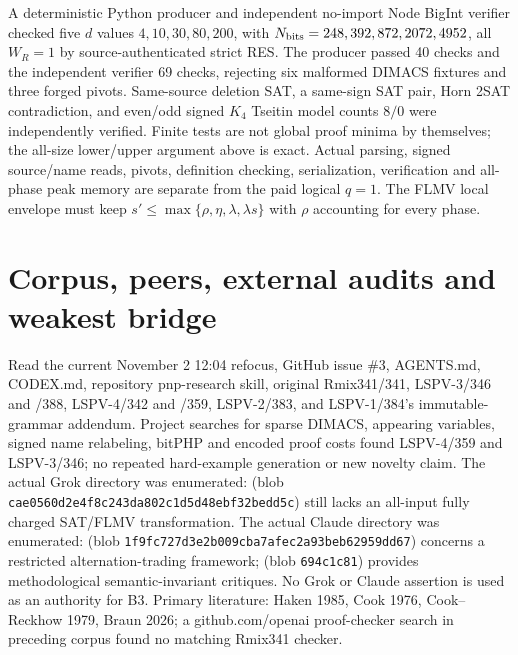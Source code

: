 \documentclass[11pt]{article}
\begin{document}
A deterministic Python producer and independent no-import Node BigInt verifier checked five $d$ values $4,10,30,80,200$, with $N_{\rm bits}=248,392,872,2072,4952$, all $W_R=1$ by source-authenticated strict RES. The producer passed 40 checks and the independent verifier 69 checks, rejecting six malformed DIMACS fixtures and three forged pivots. Same-source deletion SAT, a same-sign SAT pair, Horn 2SAT contradiction, and even/odd signed $K_4$ Tseitin model counts $8/0$ were independently verified. Finite tests are not global proof minima by themselves; the all-size lower/upper argument above is exact. Actual parsing, signed source/name reads, pivots, definition checking, serialization, verification and all-phase peak memory are separate from the paid logical $q=1$. The FLMV local envelope must keep $s'\le\max\{\rho,\eta,\lambda,\lambda s\}$ with $\rho$ accounting for every phase.

\section*{Corpus, peers, external audits and weakest bridge}
Read the current November 2 12:04 refocus, GitHub issue \#3, AGENTS.md, CODEX.md, repository pnp-research skill, original Rmix341/341, LSPV-3/346 and /388, LSPV-4/342 and /359, LSPV-2/383, and LSPV-1/384's immutable-grammar addendum. Project searches for sparse DIMACS, appearing variables, signed name relabeling, bitPHP and encoded proof costs found LSPV-4/359 and LSPV-3/346; no repeated hard-example generation or new novelty claim. The actual Grok directory was enumerated:  (blob \texttt{cae0560d2e4f8c243da802c1d5d48ebf32bedd5c}) still lacks an all-input fully charged SAT/FLMV transformation. The actual Claude directory was enumerated:  (blob \texttt{1f9fc727d3e2b009cba7afec2a93beb62959dd67}) concerns a restricted alternation-trading framework;  (blob \texttt{694c1c81}) provides methodological semantic-invariant critiques. No Grok or Claude assertion is used as an authority for B3. Primary literature: Haken 1985, Cook 1976, Cook--Reckhow 1979, Braun 2026; a github.com/openai proof-checker search in preceding corpus found no matching Rmix341 checker.
\end{document}
